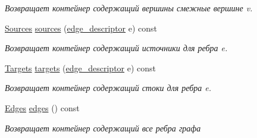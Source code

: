 \begin{DoxyCompactItemize}
\begin{DoxyCompactList}\small\item\em Возвращает контейнер содержащий вершины смежные вершине v. \end{DoxyCompactList}\item 
\mbox{\label{class_s_p_u___g_r_a_p_h_1_1_spu_ultra_graph_a1d0b0fab46b32b8ffebd435f7e5ae835}} 
\hyperlink{class_s_p_u___g_r_a_p_h_1_1_spu_ultra_graph_affd7f90cfb9b255be603cb8756dfc80d}{Sources} \hyperlink{class_s_p_u___g_r_a_p_h_1_1_spu_ultra_graph_a1d0b0fab46b32b8ffebd435f7e5ae835}{sources} (\hyperlink{class_s_p_u___g_r_a_p_h_1_1_spu_ultra_graph_a5f3776e003ef0a1648f1d9f84289810b}{edge\+\_\+descriptor} e) const
\begin{DoxyCompactList}\small\item\em Возвращает контейнер содержащий источники для ребра e. \end{DoxyCompactList}\item 
\mbox{\label{class_s_p_u___g_r_a_p_h_1_1_spu_ultra_graph_ab298125c943a8cbd0ab7cc937e4ed837}} 
\hyperlink{class_s_p_u___g_r_a_p_h_1_1_spu_ultra_graph_ae5b5d18bbcc112b25285ad2c06d32f07}{Targets} \hyperlink{class_s_p_u___g_r_a_p_h_1_1_spu_ultra_graph_ab298125c943a8cbd0ab7cc937e4ed837}{targets} (\hyperlink{class_s_p_u___g_r_a_p_h_1_1_spu_ultra_graph_a5f3776e003ef0a1648f1d9f84289810b}{edge\+\_\+descriptor} e) const
\begin{DoxyCompactList}\small\item\em Возвращает контейнер содержащий стоки для ребра e. \end{DoxyCompactList}\item 
\mbox{\label{class_s_p_u___g_r_a_p_h_1_1_spu_ultra_graph_adcef05b6bc051e5d854ee6376539b084}} 
\hyperlink{class_s_p_u___g_r_a_p_h_1_1_spu_ultra_graph_1_1_edges}{Edges} \hyperlink{class_s_p_u___g_r_a_p_h_1_1_spu_ultra_graph_adcef05b6bc051e5d854ee6376539b084}{edges} () const
\begin{DoxyCompactList}\small\item\em Возвращает контейнер содержащий все ребра графа \end{DoxyCompactList}\item 
\mbox{\label{class_s_p_u___g_r_a_p_h_1_1_spu_ultra_graph_a95e3d9d5f45f98173847d5a0254a4a1f}} 

\end{DoxyCompactItemize}

